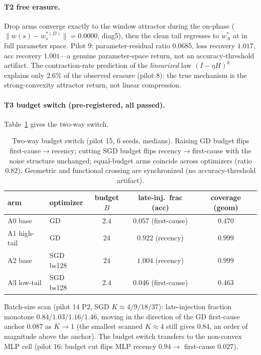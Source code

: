 \documentclass{article}
\newcommand{\B}{B}            %
\begin{document}
\paragraph{T2 free erasure.} Drop arms converge exactly to the window attractor during the
on-phase ($\|w(s)-w^{*(D)}_s\|=0.0000$, diag5), then the clean tail regresses to $w^*_A$ at
in full parameter space. Pilot 9: parameter-residual ratio $0.0685$, loss
recovery $1.017$, acc recovery $1.001$---a genuine parameter-space return, not an
accuracy-threshold artifact. The contraction-rate prediction of the \emph{linearized} law
$(I-\eta H)^k$ explains only $2.6\%$ of the observed erasure (pilot 8): the true mechanism is
the strong-convexity attractor return, not linear compression.

\paragraph{T3 budget switch (pre-registered, all passed).} Table~\ref{tab:budget} gives the
two-way switch.
\begin{table}[h]
\centering\small
\begin{tabular}{@{}llccc@{}}
\toprule
arm & optimizer & budget $\B$ & late-inj.\ frac (acc) & coverage (geom) \\
\midrule
A0 base & GD & $2.4$ & $0.057$ (first-cause) & $0.470$ \\
A1 high-tail & GD & $24$ & $0.922$ (recency) & $0.999$ \\
A2 base & SGD bs128 & $24$ & $1.004$ (recency) & $0.999$ \\
A3 low-tail & SGD bs128 & $2.4$ & $0.046$ (first-cause) & $0.463$ \\
\bottomrule
\end{tabular}
\caption{Two-way budget switch (pilot 15, 6 seeds, medians). Raising GD budget flips
first-cause$\to$recency; cutting SGD budget flips recency$\to$first-cause with the noise
structure unchanged; equal-budget arms coincide across optimizers (ratio $0.82$). Geometric and
functional crossing are synchronized (no accuracy-threshold artifact).}
\label{tab:budget}
\end{table}
Batch-size scan (pilot 14 P2, SGD $K\approx4/9/18/37$): late-injection fraction monotone
$0.84/1.03/1.16/1.46$, moving in the direction of the GD first-cause anchor $0.087$ as
$K\!\to\!1$ (the smallest scanned $K\approx4$ still gives $0.84$, an order of magnitude
above the anchor). The budget
switch transfers to the non-convex MLP cell (pilot 16: budget cut flips MLP recency $0.94\to$
first-cause $0.027$).
\end{document}
